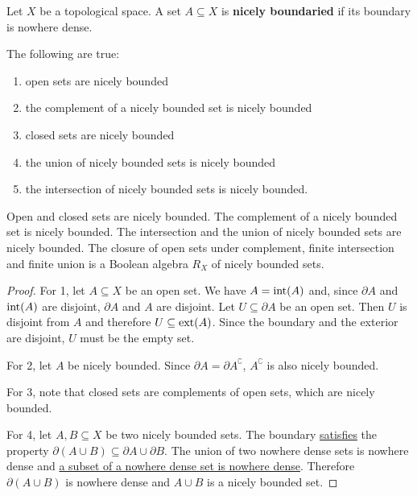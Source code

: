 \begin{mathSection}
	\begin{defn}
		Let $X$ be a topological space. A set $A \subseteq X$ is \textbf{nicely boundaried} if its boundary is nowhere dense.
	\end{defn}
	
	\begin{prop}
		The following are true:
		\begin{enumerate}
			\item open sets are nicely bounded
			\item the complement of a nicely bounded set is nicely bounded
			\item closed sets are nicely bounded
			\item the union of nicely bounded sets is nicely bounded
			\item the intersection of nicely bounded sets is nicely bounded.
		\end{enumerate}
		
		Open and closed sets are nicely bounded. The complement of a nicely bounded set is nicely bounded. The intersection and the union of nicely bounded sets are nicely bounded. The closure of open sets under complement, finite intersection and finite union is a Boolean algebra $R_X$ of nicely bounded sets.
	\end{prop}
	
	\begin{proof}
		For 1, let $A \subseteq X$ be an open set. We have $A = \operatorname{int}(A)$ and, since $\partial A$ and $\operatorname{int}(A)$ are disjoint, $\partial A$ and $A$ are disjoint. Let $U \subseteq \partial A$ be an open set. Then $U$ is disjoint from $A$ and therefore $U \subseteq \operatorname{ext}(A)$. Since the boundary and the exterior are disjoint, $U$ must be the empty set.
		
		For 2, let $A$ be nicely bounded. Since $\partial A = \partial A^{\complement}$, $A^{\complement}$ is also nicely bounded.
		
		For 3, note that closed sets are complements of open sets, which are nicely bounded.
		
		For 4, let $A, B \subseteq X$ be two nicely bounded sets. The boundary \href{https://proofwiki.org/wiki/Boundary_of_Union_is_Subset_of_Union_of_Boundaries}{satisfies} the property $\partial (A \cup B) \subseteq \partial A \cup \partial B$. The union of two nowhere dense sets is nowhere dense and \href{https://proofwiki.org/wiki/Subset_of_Nowhere_Dense_Subset_is_Nowhere_Dense}{a subset of a nowhere dense set is nowhere dense}. Therefore $\partial (A \cup B)$ is nowhere dense and $A \cup B$ is a nicely bounded set.
		

\end{proof}
\end{mathSection}
